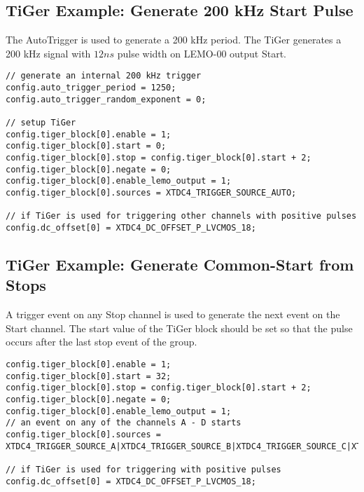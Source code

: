 \subsection{TiGer Example: Generate 200 kHz Start Pulse}
The AutoTrigger is used to generate a 200 kHz period. The TiGer generates a 200 kHz signal with $12 ns$ pulse width on LEMO-00 output Start.
\begin{lstlisting}[frame=tlrb]
// generate an internal 200 kHz trigger
config.auto_trigger_period = 1250;
config.auto_trigger_random_exponent = 0;

// setup TiGer
config.tiger_block[0].enable = 1;
config.tiger_block[0].start = 0;
config.tiger_block[0].stop = config.tiger_block[0].start + 2;
config.tiger_block[0].negate = 0;
config.tiger_block[0].enable_lemo_output = 1;
config.tiger_block[0].sources = XTDC4_TRIGGER_SOURCE_AUTO;

// if TiGer is used for triggering other channels with positive pulses
config.dc_offset[0] = XTDC4_DC_OFFSET_P_LVCMOS_18; 
\end{lstlisting}

\subsection{TiGer Example: Generate Common-Start from Stops}
A trigger event on any Stop channel is used to generate the next event on the Start channel. 
The start value of the TiGer block should be set so that the pulse occurs after the last stop event of the group.
\begin{lstlisting}[frame=tlrb]
config.tiger_block[0].enable = 1;
config.tiger_block[0].start = 32;
config.tiger_block[0].stop = config.tiger_block[0].start + 2;
config.tiger_block[0].negate = 0;
config.tiger_block[0].enable_lemo_output = 1;
// an event on any of the channels A - D starts 
config.tiger_block[0].sources = XTDC4_TRIGGER_SOURCE_A|XTDC4_TRIGGER_SOURCE_B|XTDC4_TRIGGER_SOURCE_C|XTDC4_TRIGGER_SOURCE_D;

// if TiGer is used for triggering with positive pulses
config.dc_offset[0] = XTDC4_DC_OFFSET_P_LVCMOS_18; 
\end{lstlisting}
